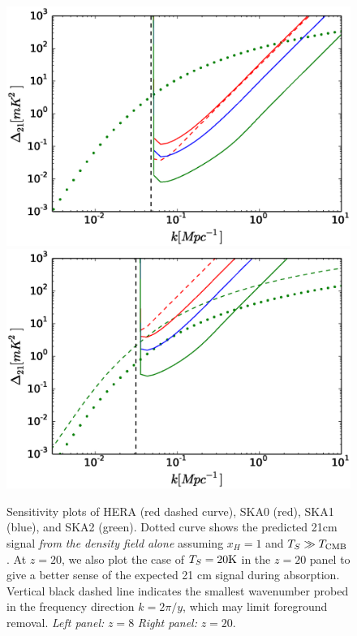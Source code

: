\documentclass{PoS}
\begin{document}
\begin{figure}[htbp]
\begin{center}
\includegraphics[scale=0.35]{figures/sensitivityPlot_z8.eps}
\includegraphics[scale=0.35]{figures/sensitivityPlot_z20.eps}
\caption{Sensitivity plots of HERA (red dashed curve), SKA0 (red), SKA1 (blue), and SKA2 (green). Dotted curve shows the predicted 21cm signal {\em from the density field alone} assuming $x_H=1$ and $T_S\gg T_{\rm CMB}$. At $z=20$, we also plot the case of $T_S=20{\rm K}$ in the $z=20$ panel to give a better sense of the expected 21 cm signal during absorption. Vertical black dashed line indicates the smallest wavenumber probed in the frequency direction $k=2\pi/y$, which may limit foreground removal.  {\em Left panel:} $z=8$ {\em Right panel:} $z=20$.}
\label{fig:sensitivity}
\end{center}
\end{figure}
\end{document}
